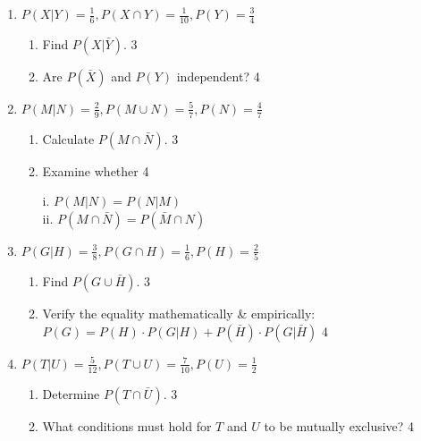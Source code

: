 \documentclass[a4paper,oneside]{book}
\begin{document}
\begin{enumerate}
\item \textbf{\( P(X \vert Y) = \frac{1}{6}, P(X \cap Y) = \frac{1}{10}, P(Y) = \frac{3}{4} \)}

\begin{enumerate}
    \item Find \( P(X \vert \bar{Y}) \). \hfill 3
    \item Are $P(\bar X)$ and $P(Y)$ independent? \hfill 4
\end{enumerate}

\item \textbf{\( P(M \vert N) = \frac{2}{9}, P(M \cup N) = \frac{5}{7}, P(N) = \frac{4}{7} \)}

\begin{enumerate}
    \item Calculate \( P(M \cap \bar{N}) \). \hfill 3
    \item Examine whether   \hfill 4
    
    i. $P(M \vert N) = P(N \vert M)$ \\
    ii. $P(M \cap \bar N) = P(\bar M \cap N)$

\end{enumerate}

\item \textbf{\( P(G \vert H) = \frac{3}{8}, P(G \cap H) = \frac{1}{6}, P(H) = \frac{2}{5} \)}

\begin{enumerate}
    \item Find \( P(G \cup \bar{H}) \). \hfill 3
	\item Verify the equality mathematically \& empirically: \\ $P(G) = P(H) \cdot P(G \vert H) + P(\bar H) \cdot P(G \vert \bar H)$ \hfill 4
\end{enumerate}

\item \textbf{\( P(T \vert U) = \frac{5}{12}, P(T \cup U) = \frac{7}{10}, P(U) = \frac{1}{2} \)}

\begin{enumerate}
    \item Determine \( P(T \cap \bar{U}) \). \hfill 3
    \item What conditions must hold for \( T \) and \( U \) to be mutually exclusive? \hfill 4
\end{enumerate}



  \end{enumerate}
\end{document}
